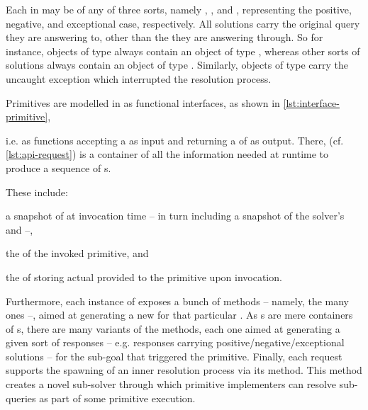 \documentclass[12pt,a4paper,openright,twoside]{book}
\begin{document}
Each  in \twopkt{} may be of any of three sorts, namely , \mbox{,} and , representing the positive, negative, and exceptional case, respectively.
%
All solutions carry the original query they are answering to, other than the  they are answering through.
%
So for instance, objects of type  always contain an object of type , whereas other sorts of solutions always contain an object of type .
%
Similarly, objects of type  carry the uncaught exception which interrupted the resolution process.

Primitives are modelled in \twopkt{} as functional interfaces, as shown in \cref{lst:interface-primitive},
%

%
i.e. as functions accepting a  as input and returning a  of  as output.
%
There,  (cf. \cref{lst:api-request}) is a container of all the information needed at runtime to produce a sequence of s.
%
%

%
These include:
%
\begin{inlinelist}
    \item a snapshot of  at invocation time -- in turn including a snapshot of the solver's  and  --,
    \item the  of the invoked primitive, and
    \item the  of  storing actual  provided to the primitive upon invocation.
\end{inlinelist}
%
Furthermore, each instance of  exposes a bunch of methods -- namely, the many  ones --, aimed at generating a new  for that particular .
%
As s are mere containers of s, there are many variants of the  methods, each one aimed at generating a given sort of responses -- e.g. responses carrying positive/negative/exceptional solutions -- for the sub-goal that triggered the primitive.
%
Finally, each request supports the spawning of an inner resolution process via its  method.
%
This method creates a novel sub-solver through which primitive implementers can resolve sub-queries as part of some primitive execution.
\end{document}
